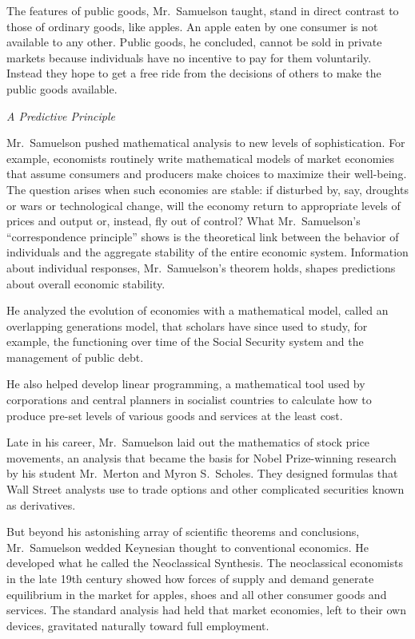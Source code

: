 ﻿\documentclass[12pt]{article}
\begin{document}
The features of public goods, Mr.~Samuelson taught, stand in direct contrast to those of ordinary
goods, like apples. An apple eaten by one consumer is not available to any other. Public goods, he
concluded, cannot be sold in private markets because individuals have no incentive to pay for them
voluntarily. Instead they hope to get a free ride from the decisions of others to make the public
goods available.

\emph{A Predictive Principle}

Mr.~Samuelson pushed mathematical analysis to new levels of sophistication. For example, economists
routinely write mathematical models of market economies that assume consumers and producers make
choices to maximize their well-being. The question arises when such economies are stable: if
disturbed by, say, droughts or wars or technological change, will the economy return to appropriate
levels of prices and output or, instead, fly out of control? What Mr.~Samuelson's ``correspondence
principle'' shows is the theoretical link between the behavior of individuals and the aggregate
stability of the entire economic system. Information about individual responses, Mr.~Samuelson's
theorem holds, shapes predictions about overall economic stability.

He analyzed the evolution of economies with a mathematical model, called an overlapping generations
model, that scholars have since used to study, for example, the functioning over time of the Social
Security system and the management of public debt.

He also helped develop linear programming, a mathematical tool used by corporations and central
planners in socialist countries to calculate how to produce pre-set levels of various goods and
services at the least cost.

Late in his career, Mr.~Samuelson laid out the mathematics of stock price movements, an analysis
that became the basis for Nobel Prize-winning research by his student Mr.~Merton and Myron
S.~Scholes. They designed formulas that Wall Street analysts use to trade options and other
complicated securities known as derivatives.

But beyond his astonishing array of scientific theorems and conclusions, Mr.~Samuelson wedded
Keynesian thought to conventional economics. He developed what he called the Neoclassical Synthesis.
The neoclassical economists in the late 19th century showed how forces of supply and demand generate
equilibrium in the market for apples, shoes and all other consumer goods and services. The standard
analysis had held that market economies, left to their own devices, gravitated naturally toward full
employment.
\end{document}
